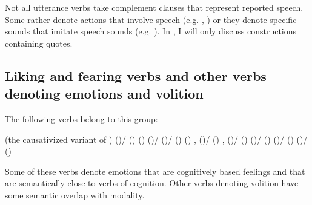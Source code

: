 Not all utterance verbs take complement clauses that represent reported speech. Some rather denote actions that involve speech (e.g. , ) or they denote specific sounds that imitate speech sounds (e.g.  ). In , I will only discuss constructions containing quotes.



\subsection{Liking and fearing verbs and other verbs denoting emotions and volition}
\label{ssec:Liking and fearing verbs and other verbs denoting emotions and volition}

The following verbs belong to this group: 
%
\begin{exe}
	\ex	\label{ex:verbs of liking of fearing}
	\begin{xlist}
		\ex	{}  
		\ex	{}  (the causativized variant of )
		\ex	{} ()\slash{} () 
		\ex	{} () 
		\ex	{} ()\slash{} 
		\ex	{} ()\slash{} () 
		\ex	{} () ,  
		\ex	{} ()\slash{} () ,  
		\ex	{} ()\slash{} () 
		\ex	{} ()\slash  {} () 
		\ex	{} ()\slash{} () 
		\ex	{} ()\slash{} () 
	\end{xlist}
\end{exe}

Some of these verbs denote emotions that are cognitively based feelings and that are semantically close to verbs of cognition. Other verbs denoting volition have some semantic overlap with modality.


